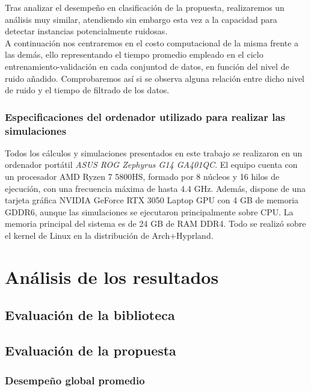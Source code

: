 \documentclass[print, color]{ugrTFG}
\begin{document}
    Tras analizar el desempeño en clasificación de la propuesta, realizaremos un análisis muy similar, atendiendo sin embargo esta vez a la capacidad para detectar instancias potencialmente ruidosas.\\

    A continuación nos centraremos en el costo computacional de la misma frente a las demás, ello representando el tiempo promedio empleado en el ciclo entrenamiento-validación en cada conjuntod de datos, en función del nivel de ruido añadido. Comprobaremos así si se observa alguna relación entre dicho nivel de ruido y el tiempo de filtrado de los datos.
    
    \subsection{Especificaciones del ordenador utilizado para realizar las simulaciones}
    
    Todos los cálculos y simulaciones presentados en este trabajo se realizaron en un ordenador portátil \textit{ASUS ROG Zephyrus G14 GA401QC}. El equipo cuenta con un procesador AMD Ryzen 7 5800HS, formado por 8 núcleos y 16 hilos de ejecución, con una frecuencia máxima de hasta 4.4 GHz. Además, dispone de una tarjeta gráfica NVIDIA GeForce RTX 3050 Laptop GPU con 4 GB de memoria GDDR6, aunque las simulaciones se ejecutaron principalmente sobre CPU. La memoria principal del sistema es de 24 GB de RAM DDR4. Todo se realizó sobre el kernel de Linux en la distribución de Arch+Hyprland. 
    

\chapter{Análisis de los resultados}\label{sect:analisisResultados}
 \section{Evaluación de la biblioteca}

\newpage
\section{Evaluación de la propuesta}
 \subsection{Desempeño global promedio}
\end{document}
